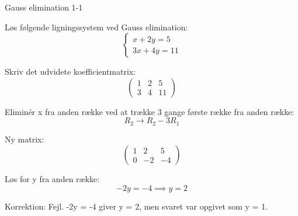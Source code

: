\documentclass{article}
\begin{document}

\tableofcontents
\newpage

\begin{exercise}{Gauss elimination 1-1}

Løs følgende ligningssystem ved Gauss elimination:
\[
\begin{cases}
x + 2y = 5 \\ 3x + 4y = 11
\end{cases}
\]


\hint

Skriv det udvidete koefficientmatrix:
\[
\begin{pmatrix}
1 & 2 & 5 \\ 
3 & 4 & 11
\end{pmatrix}
\]

\hint

Eliminér x fra anden række ved at trække 3 gange første række fra anden række:
\[
R_2 \rightarrow R_2 - 3R_1
\]

\hint

Ny matrix:
\[
\begin{pmatrix}
1 & 2 & 5 \\
0 & -2 & -4
\end{pmatrix}
\]

\hint

Løs for y fra anden række:
\[
-2y = -4 \implies y = 2
\]

\hint
Korrektion: Fejl. -2y = -4 giver y = 2, men svaret var opgivet som y = 1.

\end{exercise}
\end{document}
